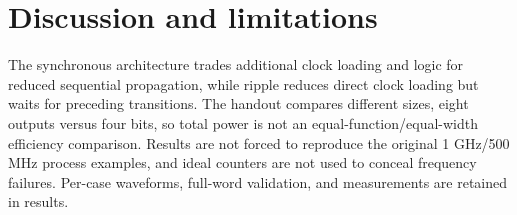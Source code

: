 \section{Discussion and limitations}

The synchronous architecture trades additional clock loading and logic for reduced sequential propagation, while ripple reduces direct clock loading but waits for preceding transitions. The handout compares different sizes, eight outputs versus four bits, so total power is not an equal-function/equal-width efficiency comparison. Results are not forced to reproduce the original 1 GHz/500 MHz process examples, and ideal counters are not used to conceal frequency failures. Per-case waveforms, full-word validation, and measurements are retained in results.
